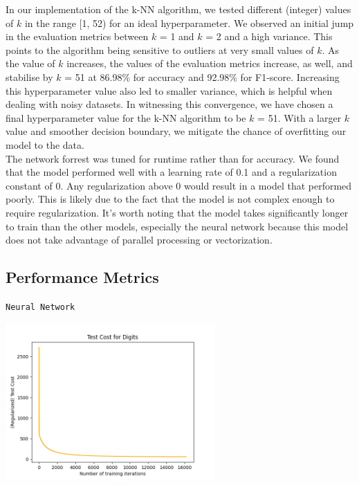 \documentclass{article}
\begin{document}
In our implementation of the k-NN algorithm, we tested different (integer) values of $k$ in the range [1, 52) for an ideal hyperparameter. 
We observed an initial jump in the evaluation metrics between $k$ = 1 and $k$ = 2 and a high variance.
This points to the algorithm being sensitive to outliers at very small values of $k$.
As the value of $k$ increases, the values of the evaluation metrics increase, as well, and stabilise by $k$ = 51 at 86.98\% for accuracy and 92.98\% for F1-score.
Increasing this hyperparameter value also led to smaller variance, which is helpful when dealing with noisy datasets.
In witnessing this convergence, we have chosen a final hyperparameter value for the k-NN algorithm to be $k$ = 51.
With a larger $k$ value and smoother decision boundary, we mitigate the chance of overfitting our model to the data.
\\

The network forrest was tuned for runtime rather than for accuracy. We found that the model performed well with a learning rate of 0.1 and a regularization constant of 0. Any regularization above 0 would result in a model that performed poorly. This is likely due to the fact that the model is not complex enough to require regularization.
It's worth noting that the model takes significantly longer to train than the other models, especially the neural network because this model does not take advantage of parallel processing or vectorization.


\subsection*{Performance Metrics}
\begin{center}
    \texttt{Neural Network}

    \includegraphics*[width=0.6\textwidth]{./src/figures/Digits-test-cost.png}
\end{center}
\end{document}
